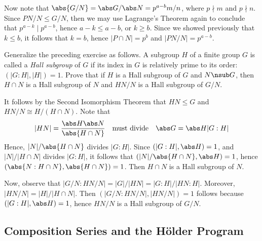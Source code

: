 \begin{problems}
\begin{sol}
        Now note that $\abs{G/N} = \abs G/\abs N = p^{a - b}m/n$, where $p \nmid m$ and $p \nmid n$. Since $PN/N \leq G/N$, then we may use Lagrange's Theorem again to conclude that $p^{a - k} \mid p^{a - b}$, hence $a - k \leq a - b$, or $k \geq b$. Since we showed previously that $k \leq b$, it follows that $k = b$, hence $|P \cap N| = p^b$ and $|PN/N| = p^{a - b}$.
    \end{sol}
    \item Generalize the preceding exercise as follows. A subgroup $H$ of a finite group $G$ is called a \textit{Hall subgroup} of $G$ if its index in $G$ is relatively prime to its order: $(|G : H|, |H|) = 1$. Prove that if $H$ is a Hall subgroup of $G$ and $N \nsub G$, then $H \cap N$ is a Hall subgroup of $N$ and $HN/N$ is a Hall subgroup of $G/N$.
    \begin{sol}
        It follows by the Second Isomorphism Theorem that $HN \leq G$ and $HN/N \cong H/(H \cap N)$. Note that
        \[|HN| = \frac{\abs H \abs N}{\abs{H \cap N}} \quad \text{must divide} \quad \abs G = \abs H |G : H|\]
        Hence, $|N|/\abs{H \cap N}$ divides $|G : H|$. Since $(|G : H|, \abs H) = 1$, and $|N|/|H \cap N|$ divides $|G : H|$, it follows that $(|N|/\abs{H \cap N}, \abs H) = 1$, hence $(\abs{N : H \cap N}, \abs{H \cap N}) = 1$. Then $H \cap N$ is a Hall subgroup of $N$.

        Now, observe that $|G/N : HN/N| = |G|/|HN| = |G:H|/|HN : H|$. Moreover, $|HN/N| = |H|/|H \cap N|$. Then $(|G/N : HN/N|, |HN/N|) = 1$ follows because $(|G : H|, \abs H) = 1$, hence $HN/N$ is a Hall subgroup of $G/N$.
    \end{sol}
\end{problems}

\newpage

\subsection{Composition Series and the H\"older Program}


